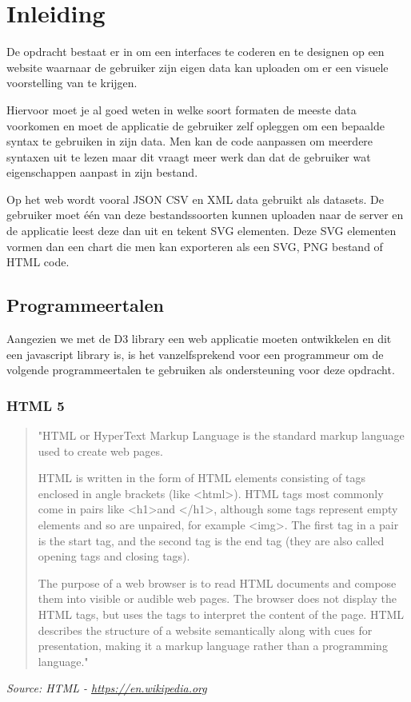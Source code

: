 \chapter[Inleiding]{Inleiding}
\label{chap_inleiding}

De opdracht bestaat er in om een interfaces te coderen en te designen op een website waarnaar de gebruiker zijn eigen data kan uploaden om  er een visuele voorstelling van te krijgen. 

Hiervoor moet je al goed weten in welke soort formaten de meeste data voorkomen en moet de applicatie de gebruiker zelf opleggen om een bepaalde syntax te gebruiken in zijn data. Men kan de code aanpassen om meerdere syntaxen uit te lezen maar dit vraagt meer werk dan dat de gebruiker wat eigenschappen aanpast in zijn bestand.

Op het web wordt vooral JSON CSV en XML data gebruikt als datasets. De gebruiker moet \'{e}\'{e}n van deze bestandssoorten kunnen uploaden naar de server en de applicatie leest deze dan uit en tekent SVG elementen. Deze SVG elementen vormen dan een chart die men kan exporteren als een SVG, PNG bestand of HTML code.


\section{Programmeertalen}
Aangezien we met de D3 library een web applicatie moeten ontwikkelen en dit een javascript library is, is het vanzelfsprekend voor een programmeur om de volgende programmeertalen te gebruiken als ondersteuning voor deze opdracht.
\subsection{HTML 5}
\begin{quote}
"HTML or HyperText Markup Language is the standard markup language used to create web pages.

HTML is written in the form of HTML elements consisting of tags enclosed in angle brackets (like \textless html\textgreater ). HTML tags most commonly come in pairs like \textless h1\textgreater and \textless /h1\textgreater , although some tags represent empty elements and so are unpaired, for example \textless img\textgreater . The first tag in a pair is the start tag, and the second tag is the end tag (they are also called opening tags and closing tags).

The purpose of a web browser is to read HTML documents and compose them into visible or audible web pages. The browser does not display the HTML tags, but uses the tags to interpret the content of the page. HTML describes the structure of a website semantically along with cues for presentation, making it a markup language rather than a programming language."
\end{quote}
\textit{Source: HTML - \url{https://en.wikipedia.org}}

